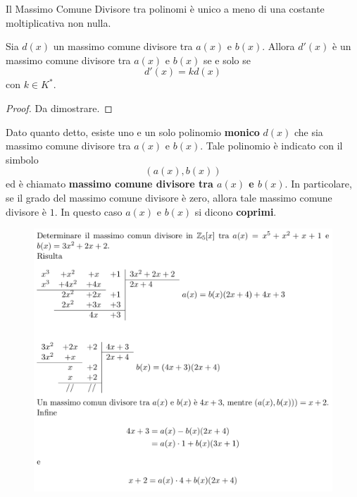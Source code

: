 \documentclass[a4paper,12pt, oneside]{book}
\begin{document}
			
			Il Massimo Comune Divisore tra polinomi è unico a meno di una costante moltiplicativa non nulla.
			
			\begin{teorema}
				Sia $d(x)$ un massimo comune divisore tra $a(x)$ e $b(x)$. Allora $d'(x)$ è un massimo comune divisore tra $a(x)$ e $b(x)$ se e solo se $$d'(x)=k d(x)$$ con $k \in K^{*}$.
				
				\begin{proof}				
					Da dimostrare. %
				\end{proof}
			\end{teorema}
			
			\begin{osservazione}
				Dato quanto detto, esiste uno e un solo polinomio \textbf{monico} $d(x)$ che sia massimo comune divisore tra $a(x)$ e $b(x)$.
				Tale polinomio è indicato con il simbolo $$(a(x), b(x))$$ ed è chiamato \textbf{massimo comune divisore tra $a(x)$ e $b(x)$}.
				In particolare, se il grado del massimo comune divisore è zero, allora tale massimo comune divisore è $1$. In questo caso $a(x)$ e $b(x)$ si dicono \textbf{coprimi}.
			\end{osservazione}
			
			\begin{shaded}
				\begin{esempio}
				\end{esempio}
				\begin{figure}[H]
					\includegraphics[width=\linewidth,scale=1]{polydiv1}
				\end{figure}	
			\end{shaded}	
			
\end{document}
